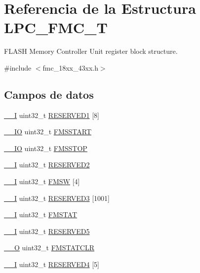 \hypertarget{struct_l_p_c___f_m_c___t}{}\section{Referencia de la Estructura L\+P\+C\+\_\+\+F\+M\+C\+\_\+T}
\label{struct_l_p_c___f_m_c___t}


F\+L\+A\+SH Memory Controller Unit register block structure.  




{\ttfamily \#include $<$fmc\+\_\+18xx\+\_\+43xx.\+h$>$}

\subsection*{Campos de datos}
\begin{DoxyCompactItemize}
\item 
\hyperlink{core__sc300_8h_af63697ed9952cc71e1225efe205f6cd3}{\+\_\+\+\_\+I} uint32\+\_\+t \hyperlink{struct_l_p_c___f_m_c___t_af618b58ac3978bca4c8977fdfb17af6b}{R\+E\+S\+E\+R\+V\+E\+D1} \mbox{[}8\mbox{]}
\item 
\hyperlink{core__sc300_8h_aec43007d9998a0a0e01faede4133d6be}{\+\_\+\+\_\+\+IO} uint32\+\_\+t \hyperlink{struct_l_p_c___f_m_c___t_afd931464b936767753c74cd28bb583b3}{F\+M\+S\+S\+T\+A\+RT}
\item 
\hyperlink{core__sc300_8h_aec43007d9998a0a0e01faede4133d6be}{\+\_\+\+\_\+\+IO} uint32\+\_\+t \hyperlink{struct_l_p_c___f_m_c___t_af1e4121d1502bf5d3b8503f870cd298a}{F\+M\+S\+S\+T\+OP}
\item 
\hyperlink{core__sc300_8h_af63697ed9952cc71e1225efe205f6cd3}{\+\_\+\+\_\+I} uint32\+\_\+t \hyperlink{struct_l_p_c___f_m_c___t_a13d8c36a296a876371d8e463cfce0bc5}{R\+E\+S\+E\+R\+V\+E\+D2}
\item 
\hyperlink{core__sc300_8h_af63697ed9952cc71e1225efe205f6cd3}{\+\_\+\+\_\+I} uint32\+\_\+t \hyperlink{struct_l_p_c___f_m_c___t_af4b7c75f896e57bb4d119d805b7b56d3}{F\+M\+SW} \mbox{[}4\mbox{]}
\item 
\hyperlink{core__sc300_8h_af63697ed9952cc71e1225efe205f6cd3}{\+\_\+\+\_\+I} uint32\+\_\+t \hyperlink{struct_l_p_c___f_m_c___t_a41e2c1a3d3b32a848a56fa4503784ee5}{R\+E\+S\+E\+R\+V\+E\+D3} \mbox{[}1001\mbox{]}
\item 
\hyperlink{core__sc300_8h_af63697ed9952cc71e1225efe205f6cd3}{\+\_\+\+\_\+I} uint32\+\_\+t \hyperlink{struct_l_p_c___f_m_c___t_ab125f077a22f39008e3bb6d519565bd9}{F\+M\+S\+T\+AT}
\item 
\hyperlink{core__sc300_8h_af63697ed9952cc71e1225efe205f6cd3}{\+\_\+\+\_\+I} uint32\+\_\+t \hyperlink{struct_l_p_c___f_m_c___t_aa83bddd1f180bafbb96085399f847cd7}{R\+E\+S\+E\+R\+V\+E\+D5}
\item 
\hyperlink{core__sc300_8h_a7e25d9380f9ef903923964322e71f2f6}{\+\_\+\+\_\+O} uint32\+\_\+t \hyperlink{struct_l_p_c___f_m_c___t_a93d0244a3c0107705443b263777c470d}{F\+M\+S\+T\+A\+T\+C\+LR}
\item 
\hyperlink{core__sc300_8h_af63697ed9952cc71e1225efe205f6cd3}{\+\_\+\+\_\+I} uint32\+\_\+t \hyperlink{struct_l_p_c___f_m_c___t_a0525236eac2d6ad9d12d40697adada82}{R\+E\+S\+E\+R\+V\+E\+D4} \mbox{[}5\mbox{]}
\end{DoxyCompactItemize}


